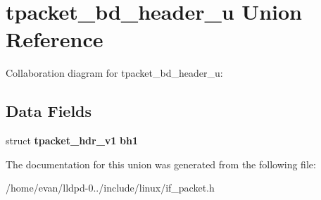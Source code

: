 \section{tpacket\-\_\-bd\-\_\-header\-\_\-u \-Union \-Reference}
\label{uniontpacket__bd__header__u}


\-Collaboration diagram for tpacket\-\_\-bd\-\_\-header\-\_\-u\-:
\subsection*{\-Data \-Fields}
\begin{DoxyCompactItemize}
\item 
struct {\bf tpacket\-\_\-hdr\-\_\-v1} {\bfseries bh1}\label{uniontpacket__bd__header__u_a2f17dcc56dd36fb477a35d076faa0876}

\end{DoxyCompactItemize}


\-The documentation for this union was generated from the following file\-:\begin{DoxyCompactItemize}
\item 
/home/evan/lldpd-\/0../include/linux/if\-\_\-packet.\-h\end{DoxyCompactItemize}
